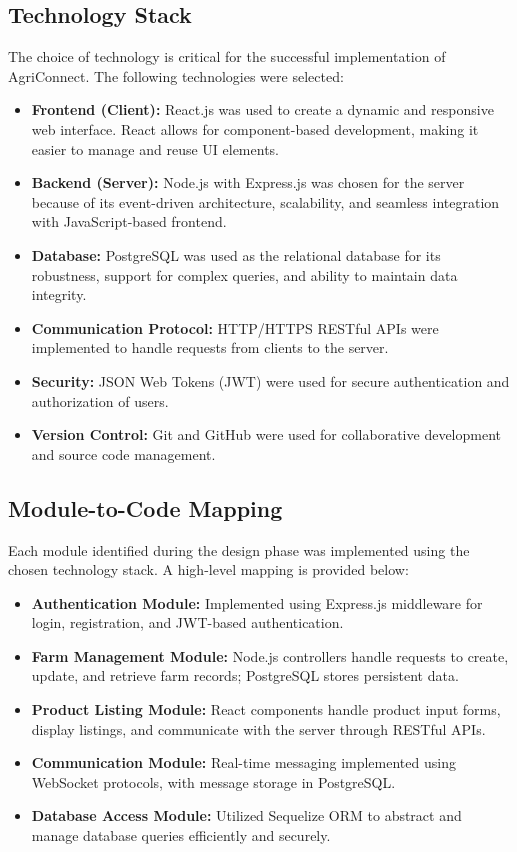 \documentclass[12pt,a4paper]{article}
\begin{document}
\subsection{Technology Stack}

The choice of technology is critical for the successful implementation of AgriConnect. The following technologies were selected:

\begin{itemize}
    \item \textbf{Frontend (Client):} React.js was used to create a dynamic and responsive web interface. React allows for component-based development, making it easier to manage and reuse UI elements.
    \item \textbf{Backend (Server):} Node.js with Express.js was chosen for the server because of its event-driven architecture, scalability, and seamless integration with JavaScript-based frontend.
    \item \textbf{Database:} PostgreSQL was used as the relational database for its robustness, support for complex queries, and ability to maintain data integrity.
    \item \textbf{Communication Protocol:} HTTP/HTTPS RESTful APIs were implemented to handle requests from clients to the server.
    \item \textbf{Security:} JSON Web Tokens (JWT) were used for secure authentication and authorization of users.
    \item \textbf{Version Control:} Git and GitHub were used for collaborative development and source code management.
\end{itemize}

\subsection{Module-to-Code Mapping}

Each module identified during the design phase was implemented using the chosen technology stack. A high-level mapping is provided below:

\begin{itemize}
    \item \textbf{Authentication Module:} Implemented using Express.js middleware for login, registration, and JWT-based authentication.
    \item \textbf{Farm Management Module:} Node.js controllers handle requests to create, update, and retrieve farm records; PostgreSQL stores persistent data.
    \item \textbf{Product Listing Module:} React components handle product input forms, display listings, and communicate with the server through RESTful APIs.
    \item \textbf{Communication Module:} Real-time messaging implemented using WebSocket protocols, with message storage in PostgreSQL.
    \item \textbf{Database Access Module:} Utilized Sequelize ORM to abstract and manage database queries efficiently and securely.
\end{itemize}
\end{document}
